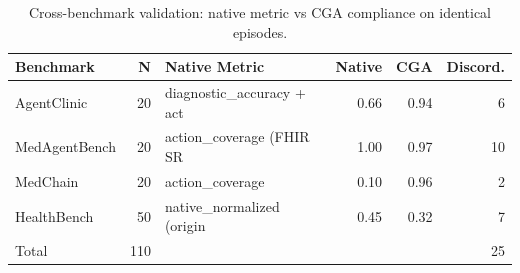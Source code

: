 \begin{table}[t]
\centering
\caption{Cross-benchmark validation: native metric vs CGA compliance on identical episodes.}
\label{tab:cross}
\begin{tabular}{lrlrrr}
\toprule
Benchmark & N & Native Metric & Native & CGA & Discord. \\
\midrule
AgentClinic & 20 & diagnostic_accuracy + act & 0.66 & 0.94 & 6 \\
MedAgentBench & 20 & action_coverage (FHIR SR  & 1.00 & 0.97 & 10 \\
MedChain & 20 & action_coverage & 0.10 & 0.96 & 2 \\
HealthBench & 50 & native_normalized (origin & 0.45 & 0.32 & 7 \\
\midrule
Total & 110 & & & & 25 \\
\bottomrule
\end{tabular}
\end{table}